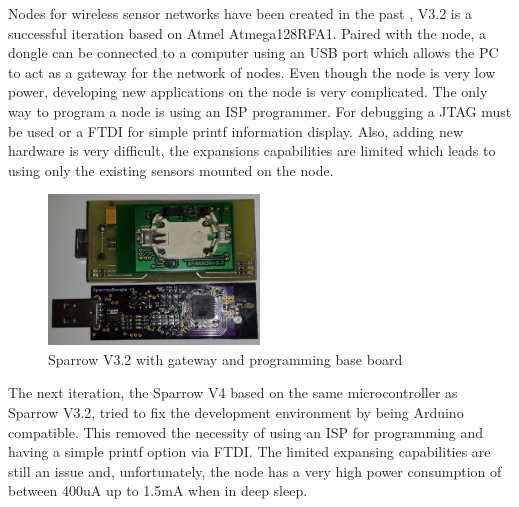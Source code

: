 Nodes for wireless sensor networks have been created in the past \cite{voinescu2013lightweight}, V3.2 is a successful
iteration based on Atmel Atmega128RFA1. Paired with the node, a dongle can be connected to a
computer using an USB port which allows the PC to act as a gateway for the network of nodes. Even
though the node is very low power, developing new applications on the node is very complicated. The
only way to program a node is using an ISP programmer. For debugging a JTAG must be used or a FTDI
for simple printf information display. Also, adding new hardware is very difficult, the expansions
capabilities are limited which leads to using only the existing sensors mounted on the node.

\begin{figure}[ht] \centering
\includegraphics[width=0.5\textwidth]{img/sparrowv32.jpg}
\caption{Sparrow V3.2 with gateway and programming base board}
\end{figure}


The next iteration, the Sparrow V4 based on the same microcontroller as Sparrow V3.2, tried to fix the development environment by being Arduino
compatible. This removed the necessity of using an ISP for programming and having a simple printf
option via FTDI. The limited expansing capabilities are still an issue and, unfortunately, the node
has a very high power consumption of between 400uA up to 1.5mA when in deep sleep.

